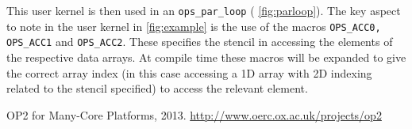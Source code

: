 \documentclass[11pt]{article}
\begin{document}
\noindent This user kernel is then used in an \texttt{ops\_par\_loop} (\figurename{ \ref{fig:parloop}}). The key aspect
to note in the user kernel in \figurename{ \ref{fig:example}} is the use of the macros \texttt{OPS\_ACC0, OPS\_ACC1} and
\texttt{OPS\_ACC2}. These specifies the stencil in accessing the elements of the respective data arrays. At compile
time these macros will be expanded to give the correct array index (in this case accessing a 1D array with 2D indexing
related to the stencil specified) to access the relevant element.

\begin{thebibliography}{1}
 OP2 for Many-Core Platforms, 2013. \url{http://www.oerc.ox.ac.uk/projects/op2}
\end{thebibliography}
\end{document}
